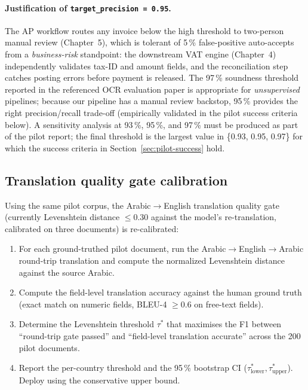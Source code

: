 \documentclass[11pt,a4paper,twoside]{report}
\begin{document}
\paragraph{Justification of \texttt{target\_precision = 0.95}.}
The AP workflow routes any invoice below the high threshold to
two-person manual review (Chapter~5), which is tolerant of 5\,\%
false-positive auto-accepts from a \emph{business-risk} standpoint:
the downstream VAT engine (Chapter~4) independently validates
tax-ID and amount fields, and the reconciliation step catches
posting errors before payment is released. The 97\,\% soundness
threshold reported in the referenced OCR evaluation paper is
appropriate for \emph{unsupervised} pipelines; because our pipeline
has a manual review backstop, 95\,\% provides the right
precision/recall trade-off (empirically validated in the pilot
success criteria below). A sensitivity analysis at 93\,\%, 95\,\%,
and 97\,\% must be produced as part of the pilot report; the final
threshold is the largest value in \{0.93, 0.95, 0.97\} for which
the success criteria in Section~\ref{sec:pilot-success} hold.

\subsection{Translation quality gate calibration}
\label{sec:pilot-translation}

Using the same pilot corpus, the Arabic$\to$English translation
quality gate (currently Levenshtein distance $\le$0.30 against the
model's re-translation, calibrated on three documents) is
re-calibrated:

\begin{enumerate}
\item For each ground-truthed pilot document, run the
Arabic$\to$English$\to$Arabic round-trip translation and
compute the normalized Levenshtein distance against the
source Arabic.
\item Compute the field-level translation accuracy against the
human ground truth (exact match on numeric fields, BLEU-4
$\ge$0.6 on free-text fields).
\item Determine the Levenshtein threshold $\tau^{*}$ that
maximises the F1 between ``round-trip gate passed'' and
``field-level translation accurate'' across the 200 pilot
documents.
\item Report the per-country threshold and the 95\,\% bootstrap
CI ($\tau^{*}_{\mathrm{lower}}, \tau^{*}_{\mathrm{upper}}$).
Deploy using the conservative upper bound.
\end{enumerate}
\end{document}
